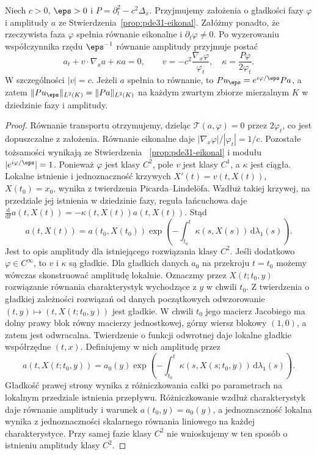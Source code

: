 \begin{stwierdzenie}
\label{prop:pde31-amplitude}
Niech $c>0$, $\eps>0$ i
$P=\partial_t^2-c^2\Delta_x$. Przyjmujemy
założenia o gładkości fazy $\varphi$ i amplitudy $a$
ze Stwierdzenia~\ref{prop:pde31-eikonal}.
Załóżmy ponadto, że rzeczywista faza $\varphi$
spełnia równanie eikonalne i $\partial_t\varphi\ne0$.
Po wyzerowaniu współczynnika rzędu $\eps^{-1}$
równanie amplitudy przyjmuje postać
\[
 a_t+v\cdot\nabla_xa+\kappa a=0,\qquad
 v=-c^2\frac{\nabla_x\varphi}{\varphi_t},
 \quad \kappa=\frac{P\varphi}{2\varphi_t}.
\]
W szczególności $|v|=c$. Jeżeli $a$ spełnia
to równanie, to
$Pu_\eps=e^{i\varphi/\eps}Pa$, a zatem
$\|Pu_\eps\|_{L^2(K)}=\|Pa\|_{L^2(K)}$
na każdym zwartym zbiorze mierzalnym $K$
w dziedzinie fazy i amplitudy.
\end{stwierdzenie}
\begin{proof}
Równanie transportu otrzymujemy, dzieląc
$\mathcal T(a,\varphi)=0$ przez $2\varphi_t$,
co jest dopuszczalne z założenia.
Równanie eikonalne daje
$|\nabla_x\varphi|/|\varphi_t|=1/c$.
Pozostałe tożsamości wynikają ze Stwierdzenia
~\ref{prop:pde31-eikonal} i modułu
$|e^{i\varphi/\eps}|=1$.
Ponieważ $\varphi$ jest klasy $C^2$, pole $v$
jest klasy $C^1$, a $\kappa$ jest ciągła.
Lokalne istnienie i jednoznaczność krzywych
$X'(t)=v(t,X(t))$, $X(t_0)=x_0$, wynika
z twierdzenia Picarda--Lindelöfa.
Wzdłuż takiej krzywej, na przedziale jej
istnienia w dziedzinie fazy, reguła łańcuchowa daje
$\frac{\mathrm d}{\mathrm dt}a(t,X(t))
=-\kappa(t,X(t))a(t,X(t))$. Stąd
\[
 a(t,X(t))=a(t_0,X(t_0))
 \exp\left(-\int_{t_0}^t\kappa(s,X(s))
 \,\mathrm d\lambda_1(s)\right).
\]
Jest to opis amplitudy dla istniejącego
rozwiązania klasy $C^2$. Jeśli dodatkowo
$\varphi\in C^\infty$, to $v$ i $\kappa$ są gładkie.
Dla gładkich danych $a_0$ na przekroju $t=t_0$
możemy wówczas skonstruować amplitudę lokalnie.
Oznaczmy przez $X(t;t_0,y)$ rozwiązanie równania
charakterystyk wychodzące z $y$ w chwili $t_0$.
Z twierdzenia o gładkiej zależności rozwiązań
od danych początkowych odwzorowanie
$(t,y)\mapsto(t,X(t;t_0,y))$ jest gładkie.
W chwili $t_0$ jego macierz Jacobiego ma
dolny prawy blok równy macierzy jednostkowej,
górny wiersz blokowy $(1,0)$, a zatem jest
odwracalna. Twierdzenie o funkcji odwrotnej
daje lokalne gładkie współrzędne $(t,x)$.
Definiujemy w nich amplitudę przez
\[
 a(t,X(t;t_0,y))=a_0(y)
 \exp\left(-\int_{t_0}^t\kappa(s,X(s;t_0,y))
 \,\mathrm d\lambda_1(s)\right).
\]
Gładkość prawej strony wynika z różniczkowania
całki po parametrach na lokalnym przedziale
istnienia przepływu. Różniczkowanie wzdłuż
charakterystyk daje równanie amplitudy i warunek
$a(t_0,y)=a_0(y)$, a jednoznaczność lokalna
wynika z jednoznaczności skalarnego równania
liniowego na każdej charakterystyce.
Przy samej fazie klasy $C^2$ nie wnioskujemy
w ten sposób o istnieniu amplitudy klasy $C^2$.
\end{proof}

